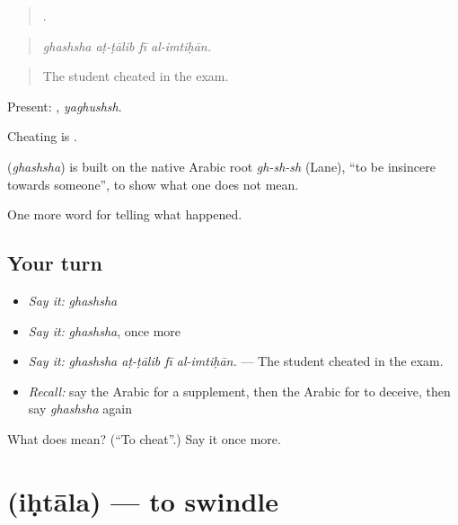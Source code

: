 \begin{quote}
   .
\end{quote}

\begin{quote}
\emph{ghashsha aṭ-ṭālib fī al-imtiḥān.}
\end{quote}

\begin{quote}
The student cheated in the exam.
\end{quote}

Present: , \emph{yaghushsh}.

Cheating is .

\begin{cousinweb}
\textbf{} (\emph{ghashsha}) is built on the native Arabic root \emph{gh-sh-sh} (Lane), \textquotedblleft{}to be insincere towards someone\textquotedblright{}, to show what one does not mean.
\end{cousinweb}

\begin{grammarlens}[title={What you've built}]
One more word for telling what happened.
\end{grammarlens}

\subsection*{Your turn}
\begin{itemize}
\raggedright
  \item \emph{Say it:} \emph{ghashsha}
  \item \emph{Say it:} \emph{ghashsha}, once more
  \item \emph{Say it:} \emph{ghashsha aṭ-ṭālib fī al-imtiḥān.} — The student cheated in the exam.
  \item \emph{Recall:} say the Arabic for a supplement, then the Arabic for to deceive, then say \emph{ghashsha} again
\end{itemize}

\begin{tcolorbox}[breakable,colback=teal!4,colframe=teal!35!black,title={Before you move on}]
What does  mean? (\textquotedblleft{}To cheat\textquotedblright{}.) Say it once more.
\end{tcolorbox}
\section[\texorpdfstring{\ar{احتال} (iḥtāla)}{احتال (iḥtāla)}]{ (iḥtāla) — to swindle}

